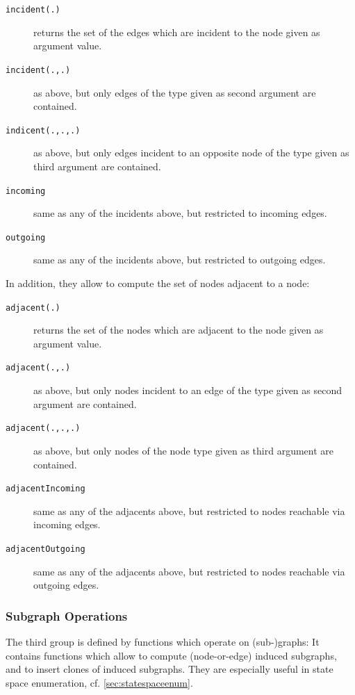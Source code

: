 \begin{description}
\item[\texttt{incident(.)}] returns the set of the edges which are incident to the node given as argument value.
\item[\texttt{incident(.,.)}] as above, but only edges of the type given as second argument are contained.
\item[\texttt{indicent(.,.,.)}] as above, but only edges incident to an opposite node of the type given as third argument are contained.
\item[\texttt{incoming}] same as any of the incidents above, but restricted to incoming edges.
\item[\texttt{outgoing}] same as any of the incidents above, but restricted to outgoing edges.
\end{description}

In addition, they allow to compute the set of nodes adjacent to a node:

\begin{description}
\item[\texttt{adjacent(.)}] returns the set of the nodes which are adjacent to the node given as argument value.
\item[\texttt{adjacent(.,.)}] as above, but only nodes incident to an edge of the type given as second argument are contained.
\item[\texttt{adjacent(.,.,.)}] as above, but only nodes of the node type given as third argument are contained.
\item[\texttt{adjacentIncoming}] same as any of the adjacents above, but restricted to nodes reachable via incoming edges.
\item[\texttt{adjacentOutgoing}] same as any of the adjacents above, but restricted to nodes reachable via outgoing edges.
\end{description}

\subsubsection*{Subgraph Operations}\label{subgraphoperations}
The third group is defined by functions which operate on (sub-)graphs:
It contains functions which allow to compute (node-or-edge) induced subgraphs, and to insert clones of induced subgraphs.
They are especially useful in state space enumeration, cf. \ref{sec:statespaceenum}.

